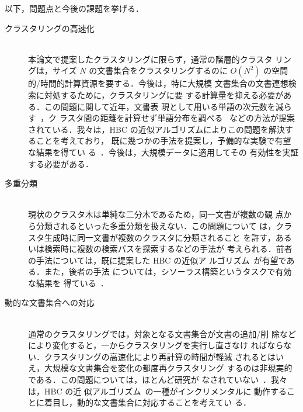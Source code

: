 以下，問題点と今後の課題を挙げる．
\begin{description}
 \item[{\gt クラスタリングの高速化}]\strut\\
	    本論文で提案したクラスタリングに限らず，通常の階層的クラスタ
	    リングは，サイズ $N$ の文書集合をクラスタリングするのに 
	    $O(N^2)$ の空間的/時間的計算資源を要する．今後は，特に大規模
	    文書集合の文書連想検索に対処するために，クラスタリングに要
	    する計算量を抑える必要がある．この問題に関して近年，文書表
	    現として用いる単語の次元数を減らす~\cite{schutze:97:a}，ク
	    ラスタ間の距離を計算せず単語分布を調べる~
	    \cite{tanaka/97/a}などの方法が提案されている．我々は，HBC 
	    の近似アルゴリズムによりこの問題を解決することを考えており，
	    既に幾つかの手法を提案し，予備的な実験で有望な結果を得てい
	    る~\cite{iwayama/97/a}．今後は，大規模データに適用してその
	    有効性を実証する必要がある．
 \item[{\gt 多重分類}]\strut\\
	    現状のクラスタ木は単純な二分木であるため，同一文書が複数の観
	    点から分類されるといった多重分類を扱えない．この問題について
	    は，クラスタ生成時に同一文書が複数のクラスタに分類されること
	    を許す，あるいは検索時に複数の検索パスを探索するなどの手法が
	    考えられる．前者の手法については，既に提案した HBC の近似ア
	    ルゴリズム~\cite{iwayama/97/a}が有望である．また，後者の手法
	    については，シソーラス構築というタスクで有効な結果を
	    得ている~\cite{tokunaga:97:a}．
 \item[{\gt 動的な文書集合への対応}]\strut\\
	    通常のクラスタリングでは，対象となる文書集合が文書の追加/削
	    除などにより変化すると，一からクラスタリングを実行し直さなけ 
	    ればならない．クラスタリングの高速化により再計算の時間が軽減
	    されるとはいえ，大規模な文書集合を変化の都度再クラスタリング
	    するのは非現実的である．この問題については，ほとんど研究が
	    なされていない~\cite{crouch:75:a,can:89:a}．我々は，HBC の近
	    似アルゴリズム~\cite{iwayama/97/a}の一種がインクリメンタルに
	    動作することに着目し，動的な文書集合に対応することを考えてい
	    る．
\end{description}

\vspace{-2mm}




\clearpage
\begin{biography}

\end{biography}

